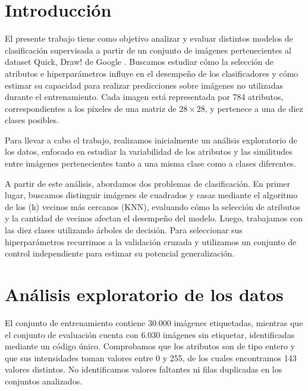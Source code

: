 \documentclass[11pt,a4paper]{article}
\begin{document}
\maketitle

\section{Introducción}

El presente trabajo tiene como objetivo analizar y evaluar distintos 
modelos de clasificación supervisada a partir de un conjunto de imágenes
pertenecientes al dataset Quick, Draw! de Google \cite{ha2017,quickdraw}. Buscamos estudiar cómo
la selección de atributos e hiperparámetros influye en el desempeño 
de los clasificadores y cómo estimar su capacidad para
realizar predicciones sobre imágenes no utilizadas durante el entrenamiento.
Cada imagen está representada por 784 atributos, correspondientes a los píxeles 
de una matriz de $28 \times 28$, y pertenece a una de diez clases posibles.

Para llevar a cabo el trabajo, realizamos inicialmente un análisis exploratorio de 
los datos, enfocado en estudiar la variabilidad de los atributos y las similitudes 
entre imágenes pertenecientes tanto a una misma clase como a clases diferentes. 

A partir de este análisis, abordamos dos problemas de clasificación. En primer lugar, 
buscamos distinguir imágenes de cuadrados y casas mediante el algoritmo de los (k) 
vecinos más cercanos (KNN), evaluando cómo la selección de atributos y la cantidad de 
vecinos afectan el desempeño del modelo. Luego, trabajamos con las diez clases utilizando 
árboles de decisión. Para seleccionar sus hiperparámetros recurrimos a la validación cruzada 
y utilizamos un conjunto de control independiente para estimar su potencial generalización.

\section{Análisis exploratorio de los datos}

El conjunto de entrenamiento contiene 30.000 imágenes
etiquetadas, mientras que el conjunto de evaluación cuenta
con 6.030 imágenes sin etiquetar, identificadas mediante
un código único. Comprobamos que los atributos son de tipo
entero y que sus intensidades toman valores entre 0 y 255,
de los cuales encontramos 143 valores distintos. No
identificamos valores faltantes ni filas duplicadas en
los conjuntos analizados.
\end{document}
